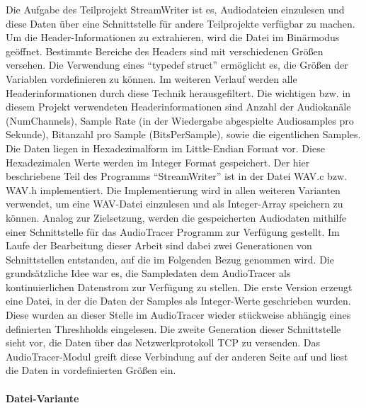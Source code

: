 Die Aufgabe des Teilprojekt StreamWriter ist es, Audiodateien einzulesen und diese Daten über eine Schnittstelle für andere Teilprojekte verfügbar zu machen.
Um die Header-Informationen zu extrahieren, wird die Datei im Binärmodus geöffnet. Bestimmte Bereiche des Headers sind mit verschiedenen Größen versehen. 
Die Verwendung eines \enquote{typedef struct} ermöglicht es, die Größen der Variablen vordefinieren zu können. 
Im weiteren Verlauf werden alle Headerinformationen durch diese Technik herausgefiltert.
Die wichtigen bzw. in diesem Projekt verwendeten Headerinformationen sind Anzahl der Audiokanäle (NumChannels), Sample Rate (in der Wiedergabe abgespielte Audiosamples pro Sekunde), Bitanzahl pro Sample (BitsPerSample), sowie die eigentlichen Samples.
Die Daten liegen in Hexadezimalform im Little-Endian Format vor. Diese Hexadezimalen Werte werden im Integer Format gespeichert. 
Der hier beschriebene Teil des Programms \enquote{StreamWriter} ist in der Datei WAV.c bzw. WAV.h implementiert. 
Die Implementierung wird in allen weiteren Varianten verwendet, um eine WAV-Datei einzulesen und als Integer-Array speichern zu können.
Analog zur Zielsetzung, werden die gespeicherten Audiodaten mithilfe einer Schnittstelle für das AudioTracer Programm zur Verfügung gestellt.
Im Laufe der Bearbeitung dieser Arbeit sind dabei zwei Generationen von Schnittstellen entstanden, auf die im Folgenden Bezug genommen wird.
Die grundsätzliche Idee war es, die Sampledaten dem AudioTracer als kontinuierlichen Datenstrom zur Verfügung zu stellen. 
Die erste Version erzeugt eine Datei, in der die Daten der Samples als Integer-Werte geschrieben wurden. Diese wurden an dieser Stelle im AudioTracer wieder stückweise abhängig eines definierten Threshholds eingelesen.
Die zweite Generation dieser Schnittstelle sieht vor, die Daten über das Netzwerkprotokoll TCP zu versenden. Das AudioTracer-Modul greift diese Verbindung auf der anderen Seite auf und liest die Daten in vordefinierten Größen ein.

\paragraph{Datei-Variante}

